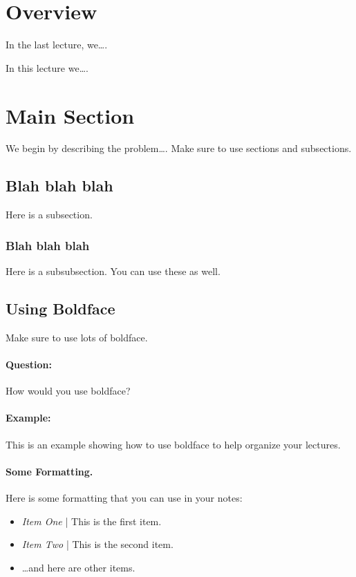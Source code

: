\documentclass{notes}
\begin{document}


\section{Overview}

In the last lecture, we\ldots.

In this lecture we\ldots.

\section{Main Section}

We begin by describing the problem\ldots.
Make sure to use sections and subsections.

\subsection{Blah blah blah}
Here is a subsection.

\subsubsection{Blah blah blah}
Here is a subsubsection. You can use these as well.

\subsection{Using Boldface}
Make sure to use lots of boldface.

\paragraph{Question:}
How would you use boldface?

\paragraph{Example:}
This is an example showing how to use boldface to 
help organize your lectures.


\paragraph{Some Formatting.}
Here is some formatting that you can use in your notes:
\begin{itemize}
\item {\em Item One\/} | This is the first item.
\item {\em Item Two\/} | This is the second item.
\item \dots and here are other items.
\end{itemize}
\end{document}
